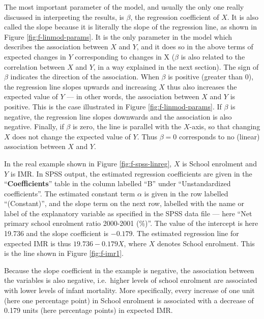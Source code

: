 \documentclass[11pt,a4paper,openany]{book}
\begin{document}
The most important parameter of the model, and usually the only one
really discussed in interpreting the results, is \(\beta\), the
regression coefficient of \(X\). It is also called the slope because it
is literally the slope of the regression line, as shown in Figure
\ref{fig:f-linmod-params}. It is the only parameter in the model which
describes the association between \(X\) and \(Y\), and it does so in the
above terms of expected changes in \(Y\) corresponding to changes in X
(\(\beta\) is also related to the correlation between \(X\) and \(Y\),
in a way explained in the next section). The sign of \(\beta\) indicates
the direction of the association. When \(\beta\) is positive (greater
than 0), the regression line slopes upwards and increasing \(X\) thus
also increases the expected value of \(Y\) --- in other words, the
association between \(X\) and \(Y\) is positive. This is the case
illustrated in Figure \ref{fig:f-linmod-params}. If \(\beta\) is
negative, the regression line slopes downwards and the association is
also negative. Finally, if \(\beta\) is zero, the line is parallel with
the \(X\)-axis, so that changing \(X\) does not change the expected
value of \(Y\). Thus \(\beta=0\) corresponds to no (linear) association
between \(X\) and \(Y\).

In the real example shown in Figure \ref{fig:f-spss-linreg}, \(X\) is
School enrolment and \(Y\) is IMR. In SPSS output, the estimated
regression coefficients are given in the ``\textbf{Coefficients}'' table
in the column labelled ``B'' under ``Unstandardized coefficients''. The
estimated constant term \(\alpha\) is given in the row labelled
``(Constant)'', and the slope term on the next row, labelled with the
name or label of the explanatory variable as specified in the SPSS data
file --- here ``Net primary school enrolment ratio 2000-2001 (\%)''. The
value of the intercept is here 19.736 and the slope coefficient is
\(-0.179\). The estimated regression line for expected IMR is thus
\(19.736-0.179 X\), where \(X\) denotes School enrolment. This is the
line shown in Figure \ref{fig:f-imr1}.

Because the slope coefficient in the example is negative, the
association between the variables is also negative, i.e.~higher levels
of school enrolment are associated with lower levels of infant
mortality. More specifically, every increase of one unit (here one
percentage point) in School enrolment is associated with a decrease of
0.179 units (here percentage points) in expected IMR.
\end{document}
